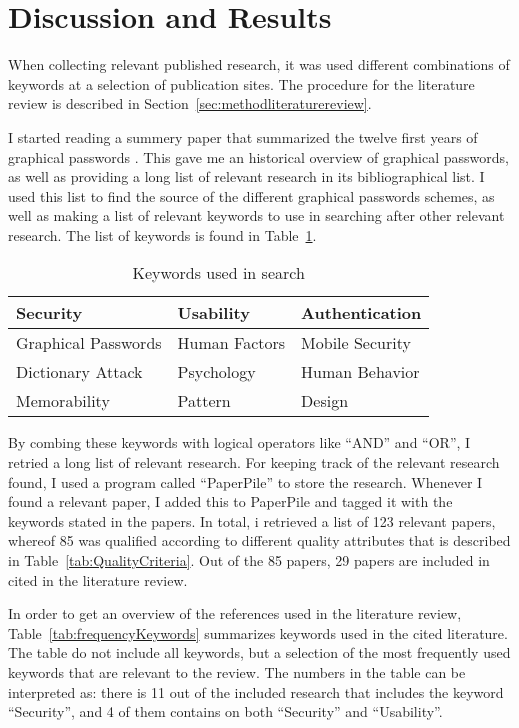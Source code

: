 \section{Discussion and Results}\label{sec:resultsLiteratureStudy}

  When collecting relevant published research, it was used different combinations of keywords at a selection of publication sites. The procedure for the literature review is described in Section~\ref{sec:methodliteraturereview}.
  
  I started reading a summery paper that summarized the twelve first years of graphical passwords \cite{Biddle}. This gave me an historical overview of graphical passwords, as well as providing a long list of relevant research in its bibliographical list. I used this list to find the source of the different graphical passwords schemes, as well as making a list of relevant keywords to use in searching after other relevant research. The list of keywords is found in Table~\ref{tab:keywords}.

    \begin{table}[H]
      \centering
      \begin{tabular}{| p{4cm} | p{3cm} | p{4cm} | }
        \hline
        Security & Usability & Authentication   \\ \hline
        Graphical Passwords & Human Factors & Mobile Security  \\ \hline
        Dictionary Attack & Psychology & Human Behavior \\ \hline
        Memorability & Pattern & Design \\ \hline
      \end{tabular}
      \caption{Keywords used in search}
      \label{tab:keywords}
    \end{table}

  By combing these keywords with logical operators like ``AND'' and ``OR'', I retried a long list of relevant research. For keeping track of the relevant research found, I used a program called ``PaperPile'' to store the research. Whenever I found a relevant paper, I added this to PaperPile and tagged it with the keywords stated in the papers. In total, i retrieved a list of 123 relevant papers, whereof 85 was qualified according to different quality attributes that is described in Table~\ref{tab:QualityCriteria}. Out of the 85 papers, 29 papers are included in cited in the literature review.

  In order to get an overview of the references used in the literature review, Table~\ref{tab:frequencyKeywords} summarizes keywords used in the cited literature. The table do not include all keywords, but a selection of the most frequently used keywords that are relevant to the review. The numbers in the table can be interpreted as: there is 11 out of the included research that includes the keyword ``Security'', and 4 of them contains on both ``Security'' and ``Usability''. 

